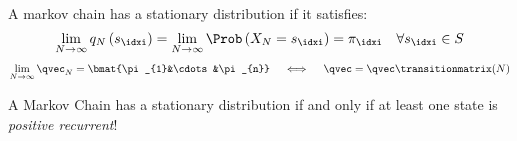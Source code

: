 \begin{defnbox}\nospacing
  \begin{defn}\label{defn:markov_chain_stationary_distribution}\leavevmode\\
    A markov chain has a stationary distribution if it satisfies:
    \begin{align*}
      \lim_{N\to\infty}q_{N}\left(s_{\idxi}\right)=\lim_{N\to\infty}\Prob \left(X_{N}=s_{\idxi}\right)=\pi_{\idxi}&&\forall s_{\idxi}\in S
    \end{align*}
    \begin{align}
      \lim_{N\to\infty}\qvec_{N}=\bmat{\pi_{1}&\cdots&\pi_{n}}\quad\iff\quad\qvec=\qvec\transitionmatrix(N)
    \end{align}
  \end{defn}
\end{defnbox}
\begin{corbox}\nospacing
  \begin{cor}\label{cor:existence_of_stationary_distributions}
    A Markov Chain has a stationary distribution if and only if at least one state is \textit{positive recurrent}!
  \end{cor}
\end{corbox}

